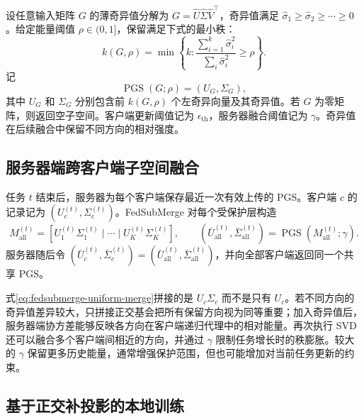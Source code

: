 设任意输入矩阵 $G$ 的薄奇异值分解为
$G=\widehat U\widehat\Sigma\widehat V^{\top}$，奇异值满足
$\widehat\sigma_1\geq\widehat\sigma_2\geq\cdots\geq0$。给定能量阈值 $\rho\in(0,1]$，保留满足下式的最小秩：
\begin{equation}
k(G,\rho)
=
\min\left\{k:
\frac{\sum_{i=1}^{k}\widehat\sigma_i^2}
     {\sum_i\widehat\sigma_i^2}
\geq\rho
\right\}.
\label{eq:fedsubmerge-energy-rule}
\end{equation}
记
\begin{equation}
\operatorname{PGS}(G;\rho)=(U_G,\Sigma_G),
\label{eq:fedsubmerge-pgs-operator}
\end{equation}
其中 $U_G$ 和 $\Sigma_G$ 分别包含前 $k(G,\rho)$ 个左奇异向量及其奇异值。若 $G$ 为零矩阵，则返回空子空间。客户端更新阈值记为 $\epsilon_{\mathrm{th}}$，服务器融合阈值记为 $\gamma$。奇异值在后续融合中保留不同方向的相对强度。

\subsection{服务器端跨客户端子空间融合}
\label{subsec:fedsubmerge-server-merge}

任务 $t$ 结束后，服务器为每个客户端保存最近一次有效上传的 PGS。客户端 $c$ 的记录记为
$(U_c^{(t)},\Sigma_c^{(t)})$。FedSubMerge 对每个受保护层构造
\begin{equation}
M_{\mathrm{all}}^{(t)}
=
\left[
U_1^{(t)}\Sigma_1^{(t)}
\mid\cdots\mid
U_K^{(t)}\Sigma_K^{(t)}
\right],
\qquad
(\bar U_{\mathrm{all}}^{(t)},\bar\Sigma_{\mathrm{all}}^{(t)})
=
\operatorname{PGS}\!\left(M_{\mathrm{all}}^{(t)};\gamma\right).
\label{eq:fedsubmerge-uniform-merge}
\end{equation}
服务器随后令
$(\bar U_c^{(t)},\bar\Sigma_c^{(t)})=(\bar U_{\mathrm{all}}^{(t)},\bar\Sigma_{\mathrm{all}}^{(t)})$，并向全部客户端返回同一个共享 PGS。

式\eqref{eq:fedsubmerge-uniform-merge}拼接的是 $U_c\Sigma_c$ 而不是只有 $U_c$。若不同方向的奇异值差异较大，只拼接正交基会把所有保留方向视为同等重要；加入奇异值后，服务器端协方差能够反映各方向在客户端递归代理中的相对能量。再次执行 SVD 还可以融合多个客户端间相近的方向，并通过 $\gamma$ 限制任务增长时的秩膨胀。较大的 $\gamma$ 保留更多历史能量，通常增强保护范围，但也可能增加对当前任务更新的约束。

\subsection{基于正交补投影的本地训练}
\label{subsec:fedsubmerge-local-projection}

